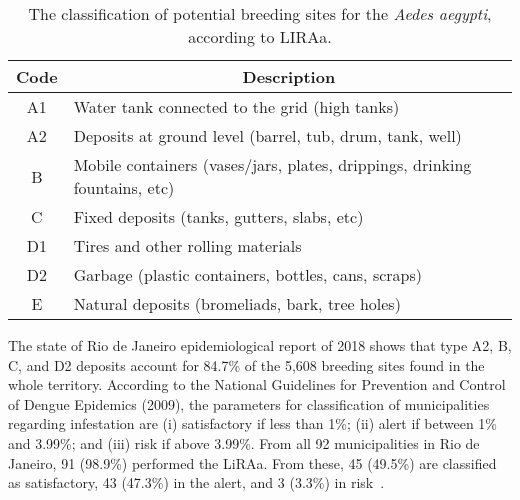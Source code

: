 \begin{table}[b!]
\begin{tabular}{cl}
\toprule
\textbf{Code} & \multicolumn{1}{c}{\textbf{Description}}\\ \hline
A1 & Water tank connected to the grid (high tanks)\\
A2 & Deposits at ground level (barrel, tub, drum, tank, well) \\
B  & Mobile containers (vases/jars, plates, drippings, drinking fountains, etc) \\
C  & Fixed deposits (tanks, gutters, slabs, etc) \\
D1 & Tires and other rolling materials \\
D2 & Garbage (plastic containers, bottles, cans, scraps) \\
E  & Natural deposits (bromeliads, bark, tree holes) \\ \bottomrule
\end{tabular}
\caption{The classification of potential breeding sites for the {\it Aedes aegypti}, according to LIRAa.}
\label{tab:deposits}
\end{table}



The state of Rio de Janeiro epidemiological report of 2018 shows that type A2, B, C, and D2 deposits account for 84.7\% of the 5,608 breeding sites found in the whole territory.
According to the National Guidelines for Prevention and Control of Dengue Epidemics (2009), the parameters for classification of municipalities regarding \Aedes infestation are (i) satisfactory if less than 1\%; (ii) alert if between 1\% and 3.99\%; and (iii) risk if above 3.99\%.
From all 92 municipalities in Rio de Janeiro, 91 (98.9\%) performed the LiRAa.
From these, 45 (49.5\%) are classified as satisfactory, 43 (47.3\%) in the alert, and 3 (3.3\%) in risk~\cite{rj2018epid52018}.


